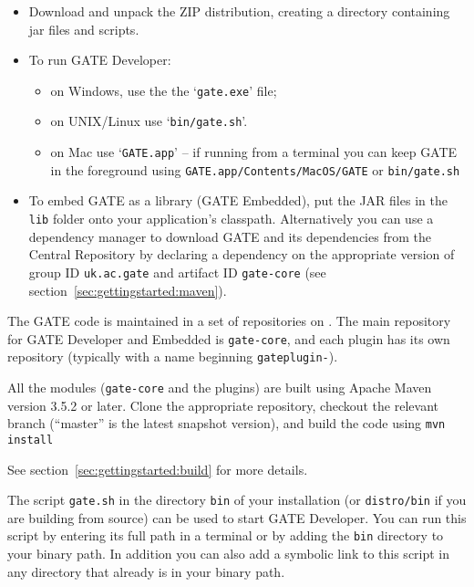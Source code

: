\begin{itemize}
\item
Download and unpack the ZIP distribution, creating a directory containing jar
files and scripts.
\item To run GATE Developer: 
  \begin{itemize}
  \item on Windows, use the the `\verb!gate.exe!' file;
  \item on UNIX/Linux use `\verb!bin/gate.sh!'.
  \item on Mac use `\verb!GATE.app!' -- if running from a terminal you can keep
  GATE in the foreground using \verb!GATE.app/Contents/MacOS/GATE! or
  \verb!bin/gate.sh!
  \end{itemize}
\item
To embed GATE as a library (GATE Embedded), put the JAR files in the
{\tt lib} folder onto your application's classpath.  Alternatively you can use
a dependency manager to download GATE and its dependencies from the Central
Repository by declaring a dependency on the appropriate version of group ID
\verb!uk.ac.gate! and artifact ID \verb!gate-core! (see
section~\ref{sec:gettingstarted:maven}).
\end{itemize}


\label{sec:gettingstarted:svn}

The GATE code is maintained in a set of repositories on
.
The main repository for GATE Developer and Embedded is \verb!gate-core!, and
each plugin has its own repository (typically with a name beginning
\verb!gateplugin-!).

All the modules (\verb!gate-core! and the plugins) are built using Apache Maven
version 3.5.2 or later.  Clone the appropriate repository, checkout the
relevant branch (``master'' is the latest snapshot version), and build the code
using \verb!mvn install!

See section~\ref{sec:gettingstarted:build} for more details.

%
The script \verb|gate.sh| in the directory \verb|bin| of your installation
(or \verb!distro/bin! if you are building from source)
can be used to start GATE Developer. You can run this script by entering
its full path in a terminal or by adding the \verb|bin| directory to your 
binary path. In addition you can also add a symbolic link to this script 
in any directory that already is in your binary path.

